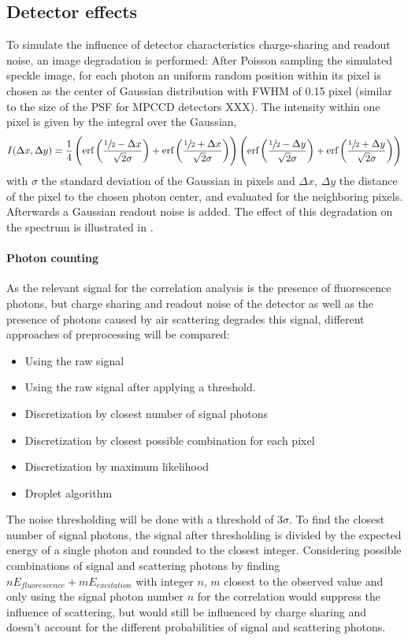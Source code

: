 \subsection{Detector effects}
To simulate the influence of detector characteristics charge-sharing and readout noise, an image degradation is performed: After Poisson sampling the simulated speckle image, for each photon an uniform random position within its pixel is chosen as the center of Gaussian distribution with FWHM of 0.15 pixel  (similar to the size of the PSF for MPCCD detectors XXX).
The intensity within one pixel is given by the integral over the Gaussian,
\begin{equation}
	I(\Delta x,\Delta y)=\frac{1}{4} \left(\text{erf}\left(\frac{\sfrac{1}{2}-\Delta x}{\sqrt{2}
		\sigma}\right)+\text{erf}\left(\frac{\sfrac{1}{2}+\Delta x}{\sqrt{2} \sigma}\right)\right) \left(\text{erf}\left(\frac{\sfrac{1}{2}-\Delta y}{\sqrt{2}
		\sigma}\right)+\text{erf}\left(\frac{\sfrac{1}{2}+\Delta y}{\sqrt{2} \sigma}\right)\right)
\end{equation}
with $\sigma$ the standard deviation of the Gaussian in pixels and $\Delta x$, $\Delta y$ the distance of the pixel to the chosen photon center, and evaluated for the neighboring pixels. Afterwards a Gaussian readout noise is added. The effect of this degradation on the spectrum is illustrated in .



\paragraph{Photon counting}
As the relevant signal for the correlation analysis is the presence of fluorescence photons, but charge sharing and readout noise of the detector as well as the presence of photons caused by air scattering degrades this signal, different approaches  of preprocessing will be compared:

\begin{itemize}
	\item Using the raw signal
	\item Using the raw signal after applying a threshold.
	\item Discretization by closest number of signal photons
	\item Discretization by closest possible combination for each pixel
	\item Discretization by maximum likelihood
	\item Droplet algorithm
\end{itemize}
The noise thresholding will be done with a threshold of 3$\sigma$. To find the closest number of signal photons, the signal after thresholding is divided by the expected energy of a single photon and rounded to the closest integer. Considering possible combinations of signal and scattering photons by finding  $nE_{fluorescence}+mE_{excitation}$ with integer $n$, $m$ closest to the observed value and only using the signal photon number $n$ for the correlation would suppress the influence of scattering, but would still be influenced by charge sharing and doesn't account for the different probabilities of signal and scattering photons.


